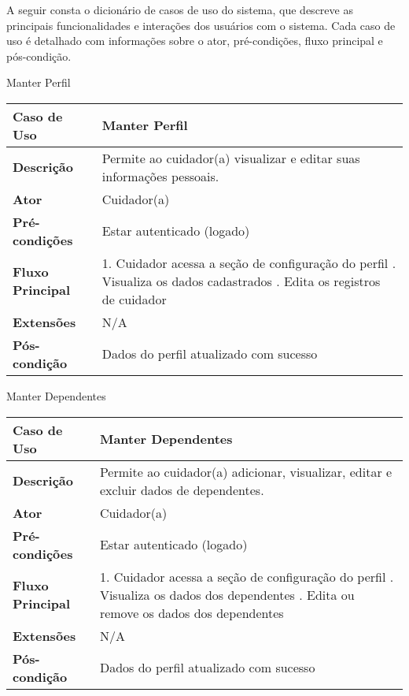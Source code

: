 A seguir consta o dicionário de casos de uso do sistema, que descreve as principais funcionalidades e interações dos usuários com o sistema. Cada caso de uso é detalhado com informações sobre o ator, pré-condições, fluxo principal e pós-condição.



\begin{quadro}
    \caption{\label{quadro_manter_perfil}Manter Perfil}
    \begin{tabular}{|l|p{12cm}|}
        \hline
        \textbf{Caso de Uso} & Manter Perfil \\ \hline
        \textbf{Descrição} & Permite ao cuidador(a) visualizar e editar suas informações pessoais. \\ \hline
        \textbf{Ator} & Cuidador(a) \\ \hline
        \textbf{Pré-condições} & Estar autenticado (logado) \\ \hline
        \textbf{Fluxo Principal} & 1. Cuidador acessa a seção de configuração do perfil \newline 2. Visualiza os dados cadastrados \newline 3. Edita os registros de cuidador \\ \hline
        \textbf{Extensões} & N/A \\ \hline
        \textbf{Pós-condição} & Dados do perfil atualizado com sucesso \\ \hline
    \end{tabular}
\end{quadro}


\begin{quadro}
    \caption{\label{quadro_manter_dependentes}Manter Dependentes}
    \begin{tabular}{|l|p{12cm}|}
        \hline
        \textbf{Caso de Uso} & Manter Dependentes \\ \hline
        \textbf{Descrição} & Permite ao cuidador(a) adicionar, visualizar, editar e excluir dados de dependentes. \\ \hline
        \textbf{Ator} & Cuidador(a) \\ \hline
        \textbf{Pré-condições} & Estar autenticado (logado) \\ \hline
        \textbf{Fluxo Principal} & 1. Cuidador acessa a seção de configuração do perfil \newline 2. Visualiza os dados dos dependentes \newline 3. Edita ou remove os dados dos dependentes \\ \hline
        \textbf{Extensões} & N/A \\ \hline
        \textbf{Pós-condição} & Dados do perfil atualizado com sucesso \\ \hline
    \end{tabular}
\end{quadro}


